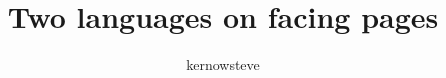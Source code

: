 \documentclass[11pt,a4paper,titlepage,twoside]{article}
\title{Two languages on facing pages}
\author{kernowsteve}
\begin{document}
      \maketitle
      \begin{Parallel}[p]{}{}
        \ParallelLText{%
          \blinddocument
        }
      \end{Parallel}
    
\end{document}
